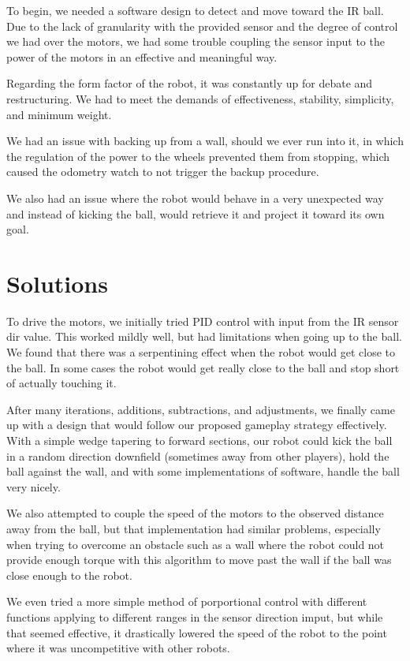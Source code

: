 \documentclass[journal]{../IEEEtran}
\begin{document}
To begin, we needed a software design to detect and move toward the IR ball. Due to the lack of granularity with the provided sensor and the degree of control we had over the motors, we had some trouble coupling the sensor input to the power of the motors in an effective and meaningful way.

Regarding the form factor of the robot, it was constantly up for debate and restructuring. We had to meet the demands of effectiveness, stability, simplicity, and minimum weight.

We had an issue with backing up from a wall, should we ever run into it, in which the regulation of the power to the wheels prevented them from stopping, which caused the odometry watch to not trigger the backup procedure.

We also had an issue where the robot would behave in a very unexpected way and instead of kicking the ball, would retrieve it and project it toward its own goal.

\section{Solutions}\label{S.solutions}

To drive the motors, we initially tried PID control with input from the IR sensor dir value. This worked mildly well, but had limitations when going up to the ball. We found that there was a serpentining effect when the robot would get close to the ball. In some cases the robot would get really close to the ball and stop short of actually touching it. 

After many iterations, additions, subtractions, and adjustments, we finally came up with a design that would follow our proposed gameplay strategy effectively. With a simple wedge tapering to forward sections, our robot could kick the ball in a random direction downfield (sometimes away from other players), hold the ball against the wall, and with some implementations of software, handle the ball very nicely.

We also attempted to couple the speed of the motors to the observed distance away from the ball, but that implementation had similar problems, especially when trying to overcome an obstacle such as a wall where the robot could not provide enough torque with this algorithm to move past the wall if the ball was close enough to the robot.

We even tried a more simple method of porportional control with different functions applying to different ranges in the sensor direction imput, but while that seemed effective, it drastically lowered the speed of the robot to the point where it was uncompetitive with other robots.
\end{document}
